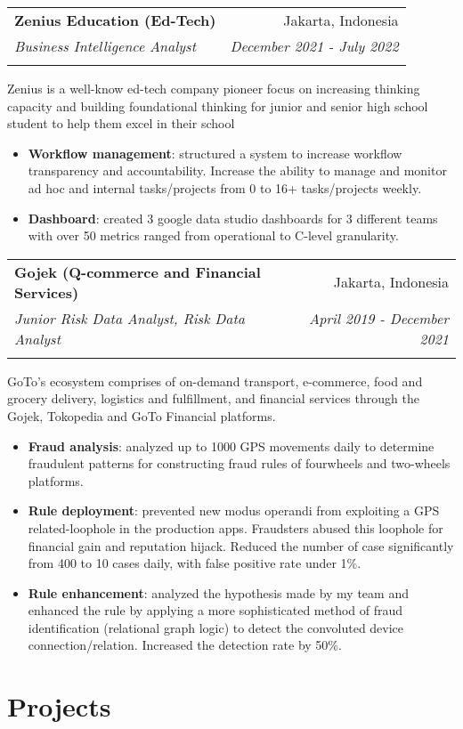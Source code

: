 \documentclass[a4paper, 11pt]{article}
\makeatletter
\newcommand{\resumeItem}[2]{
    \item\small{
        \textbf{#1}{: #2 \vspace{-2pt}}
    }
}
\newcommand{\resumeSubheading}[4]{
    \vspace{-1pt}
    \begin{tabular*}{0.97\textwidth}{l@{\extracolsep{\fill}}r}
        \color{lightblue}\textbf{#1} & #2 \\
        \textit{\small#3} & \textit{\small #4} \\
        \textnormal{}\vspace{-5pt}
    \end{tabular*}\vspace{-5pt}
}
\newcommand{\resumeSubHeadingListEnd}{\end{itemize}}
\newcommand{\resumeItemListStart}{\begin{itemize}[leftmargin=*]\setlength\itemsep{0em}\vspace{-1pt}}
\newcommand{\resumeItemListEnd}{\end{itemize}\vspace{-5pt}}
\makeatother
\begin{document}
    \vspace{5pt}
    \resumeSubheading
    {Zenius Education (Ed-Tech)}
    {Jakarta, Indonesia}
    {Business Intelligence Analyst}
    {December 2021 - July 2022}
    {Zenius is a well-know ed-tech company pioneer focus on increasing thinking capacity and building foundational thinking for junior
    and senior high school student to help them excel in their school}
    \vspace{-5pt}
    \resumeItemListStart
    \resumeItem{Workflow management}{structured a system to increase workflow transparency and accountability. 
    Increase the ability to manage and monitor ad hoc and internal tasks/projects from 0 to 16+ tasks/projects weekly.}
    \resumeItem{Dashboard}{created 3 google data studio dashboards for 3 different teams with 
    over 50 metrics ranged from operational to C-level granularity.}
    \resumeItemListEnd

    \vspace{5pt}
    \resumeSubheading
    {Gojek (Q-commerce and Financial Services)}
    {Jakarta, Indonesia}
    {Junior Risk Data Analyst, Risk Data Analyst}
    {April 2019 - December 2021}
    {GoTo’s ecosystem comprises of on-demand transport, e-commerce, food and grocery delivery, logistics and fulfillment, and financial
    services through the Gojek, Tokopedia and GoTo Financial platforms.}
    \vspace{-5pt}
    \resumeItemListStart
    \resumeItem{Fraud analysis}{analyzed up to 1000 GPS movements daily to determine 
    fraudulent patterns for constructing fraud rules of fourwheels and two-wheels platforms.}
    \resumeItem{Rule deployment}{prevented new modus operandi from exploiting a GPS related-loophole in the production apps. 
    Fraudsters abused this loophole for financial gain and reputation hijack. Reduced the number of
    case significantly from 400 to 10 cases daily, with false positive rate under 1\%.}
    \resumeItem{Rule enhancement}{analyzed the hypothesis made by my team 
    and enhanced the rule by applying a more sophisticated method of fraud identification (relational graph logic) 
    to detect the convoluted device connection/relation. Increased the detection rate by 50\%.}
    \resumeItemListEnd


    \vspace{-5pt}
    \section{Projects}
\end{document}
